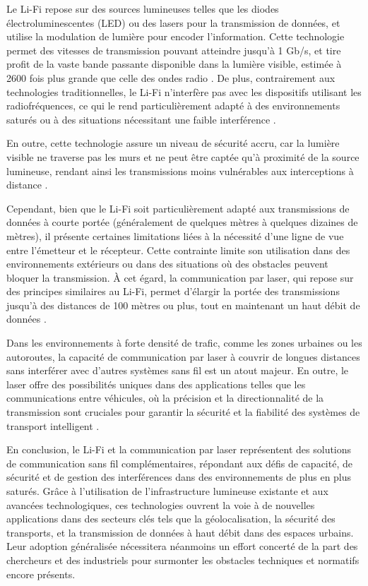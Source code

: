 \documentclass[french,titlepage]{extarticle}
\begin{document}
Le Li-Fi repose sur des sources lumineuses telles que les diodes électroluminescentes
(LED) ou des lasers pour la transmission de données, et utilise la
modulation de lumière pour encoder l\textquoteright information. Cette
technologie permet des vitesses de transmission pouvant atteindre
jusqu\textquoteright à 1 Gb/s, et tire profit de la vaste bande passante
disponible dans la lumière visible, estimée à 2600 fois plus grande
que celle des ondes radio \cite{key-17}. De plus, contrairement aux
technologies traditionnelles, le Li-Fi n\textquoteright interfère
pas avec les dispositifs utilisant les radiofréquences, ce qui le
rend particulièrement adapté à des environnements saturés ou à des
situations nécessitant une faible interférence \cite{key-7}.

En outre, cette technologie assure un niveau de sécurité accru, car
la lumière visible ne traverse pas les murs et ne peut être captée
qu\textquoteright à proximité de la source lumineuse, rendant ainsi
les transmissions moins vulnérables aux interceptions à distance \cite{key-21}.

Cependant, bien que le Li-Fi soit particulièrement adapté aux transmissions
de données à courte portée (généralement de quelques mètres à quelques
dizaines de mètres), il présente certaines limitations liées à la
nécessité d\textquoteright une ligne de vue entre l\textquoteright émetteur
et le récepteur. Cette contrainte limite son utilisation dans des
environnements extérieurs ou dans des situations où des obstacles
peuvent bloquer la transmission. À cet égard, la communication par
laser, qui repose sur des principes similaires au Li-Fi, permet d\textquoteright élargir
la portée des transmissions jusqu\textquoteright à des distances de
100 mètres ou plus, tout en maintenant un haut débit de données \cite{key-17}.

Dans les environnements à forte densité de trafic, comme les zones
urbaines ou les autoroutes, la capacité de communication par laser
à couvrir de longues distances sans interférer avec d\textquoteright autres
systèmes sans fil est un atout majeur. En outre, le laser offre des
possibilités uniques dans des applications telles que les communications
entre véhicules, où la précision et la directionnalité de la transmission
sont cruciales pour garantir la sécurité et la fiabilité des systèmes
de transport intelligent \cite{key-21}.

En conclusion, le Li-Fi et la communication par laser représentent
des solutions de communication sans fil complémentaires, répondant
aux défis de capacité, de sécurité et de gestion des interférences
dans des environnements de plus en plus saturés. Grâce à l\textquoteright utilisation
de l\textquoteright infrastructure lumineuse existante et aux avancées
technologiques, ces technologies ouvrent la voie à de nouvelles applications
dans des secteurs clés tels que la géolocalisation, la sécurité des
transports, et la transmission de données à haut débit dans des espaces
urbains. Leur adoption généralisée nécessitera néanmoins un effort
concerté de la part des chercheurs et des industriels pour surmonter
les obstacles techniques et normatifs encore présents.
\end{document}
